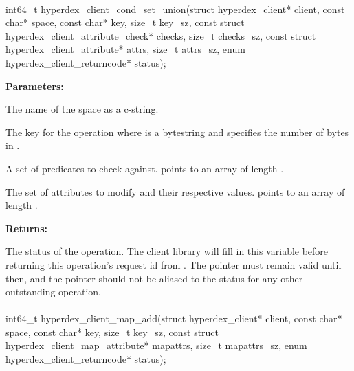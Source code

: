\paragraph{}
\label{api:c:cond_set_union}
\begin{ccode}
int64_t hyperdex_client_cond_set_union(struct hyperdex_client* client,
        const char* space,
        const char* key, size_t key_sz,
        const struct hyperdex_client_attribute_check* checks, size_t checks_sz,
        const struct hyperdex_client_attribute* attrs, size_t attrs_sz,
        enum hyperdex_client_returncode* status);
\end{ccode}
\funcdesc 

\noindent\textbf{Parameters:}
\begin{description}[labelindent=\widthof{{\code{checks}, \code{checks\_sz}}},leftmargin=*,noitemsep,nolistsep,align=right]
\item[\code{space}] The name of the space as a c-string.
\item[\code{key}, \code{key\_sz}] The key for the operation where  is a bytestring and  specifies the number of bytes in .
\item[\code{checks}, \code{checks\_sz}] A set of predicates to check against.   points to an array of length .
\item[\code{attrs}, \code{attrs\_sz}] The set of attributes to modify and their respective values.   points to an array of length .
\end{description}

\noindent\textbf{Returns:}
\begin{description}[labelindent=\widthof{{\code{status}}},leftmargin=*,noitemsep,nolistsep,align=right]
\item[\code{status}] The status of the operation.  The client library will fill in this variable before returning this operation's request id from .  The pointer must remain valid until then, and the pointer should not be aliased to the status for any other outstanding operation.
\end{description}

\paragraph{}
\label{api:c:map_add}
\begin{ccode}
int64_t hyperdex_client_map_add(struct hyperdex_client* client,
        const char* space,
        const char* key, size_t key_sz,
        const struct hyperdex_client_map_attribute* mapattrs, size_t mapattrs_sz,
        enum hyperdex_client_returncode* status);
\end{ccode}
\funcdesc 

